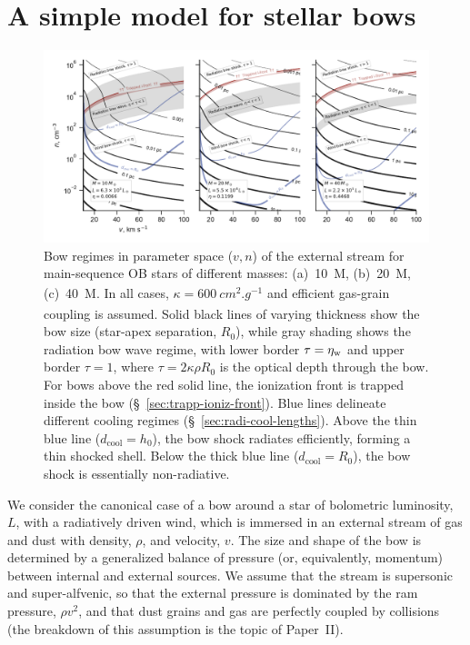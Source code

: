 \section{A simple model for stellar bows}
\label{sec:strong-gas-grain}

\begin{figure}
  \includegraphics[width=\linewidth]{figs/zones-v-n-plane}
  \caption{Bow regimes in parameter space (\(v, n\)) of the external
    stream for main-sequence OB stars of different masses:
    (a)~\SI{10}{M_\odot}, (b)~\SI{20}{M_\odot}, (c)~\SI{40}{M_\odot}.  In all
    cases, \(\kappa = \SI{600}{cm^2.g^{-1}}\) and efficient gas-grain
    coupling is assumed. Solid black lines of varying thickness show the
    bow size (star-apex separation, \(R_0\)), while gray shading shows
    the radiation bow wave regime, with lower border
    \(\tau = \eta_{\text{w}}\) and upper border \(\tau = 1\), where
    \(\tau = 2 \kappa \rho R_0\) is the optical depth through the bow.  For bows
    above the red solid line, the ionization front is trapped inside
    the bow (\S~\ref{sec:trapp-ioniz-front}).  Blue lines delineate
    different cooling regimes (\S~\ref{sec:radi-cool-lengths}).  Above
    the thin blue line (\(d_{\text{cool}} = h_0\)), the bow shock
    radiates efficiently, forming a thin shocked shell.  Below the
    thick blue line (\(d_{\text{cool}} = R_0\)), the bow shock is
    essentially non-radiative.}
  \label{fig:zones-v-n-plane}
\end{figure}


We consider the canonical case of a bow around a star of bolometric
luminosity, \(L\), with a radiatively driven wind, which is immersed
in an external stream of gas and dust with density, \(\rho\), and
velocity, \(v\).  The size and shape of the bow is determined by a
generalized balance of pressure (or, equivalently, momentum) between
internal and external sources.  We assume that the stream is
supersonic and super-alfvenic, so that the external pressure is
dominated by the ram pressure, \(\rho v^2\), and that dust grains and gas
are perfectly coupled by collisions (the breakdown of this assumption
is the topic of Paper~II).

